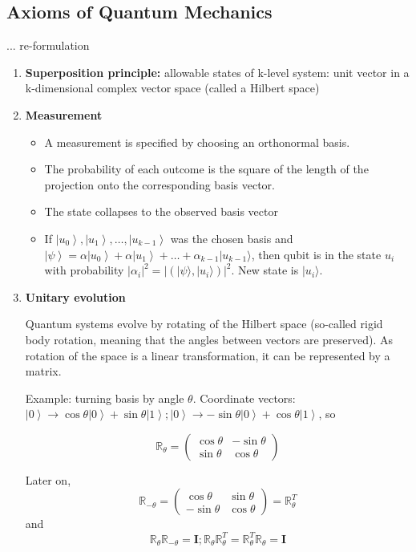 \documentclass{scrartcl}
\newcommand{\bigR}{\mathbb{R}} %
\newcommand{\ket}[1]{\left| #1 \right>} %
\begin{document}
\subsection{Axioms of Quantum Mechanics}
\label{sec:5-2}
... re-formulation
\begin{enumerate}
\item {\bf Superposition principle: } allowable states of k-level system: unit
  vector in a k-dimensional complex vector space (called a Hilbert space)

\item {\bf Measurement}

  \begin{itemize}
  \item A measurement is specified by choosing an orthonormal basis.
  \item The probability of each outcome is the square of the length of the
    projection onto the corresponding basis vector.
  \item The state collapses to the observed basis vector
  \item If $\ket{u_0}, \ket{u_1}, \dots, \ket{u_{k-1}}$ was the chosen basis and
    $\ket\psi = \alpha \ket{u_0} + \alpha \ket{u_1} + \dots + \alpha_{k-1} |
    u_{k-1}\rangle$, then qubit is in the state $u_i$ with probability
    $|\alpha_i|^2 = |(|\psi \rangle,|u_i\rangle)|^2$. New state is
    $|u_i\rangle$.
  \end{itemize}


\item {\bf Unitary evolution}

  Quantum systems evolve by rotating of the Hilbert space (so-called rigid body
  rotation, meaning that the angles between vectors are preserved). As rotation
  of the space is a linear transformation, it can be represented by a matrix.

  Example: turning basis by angle $\theta$. Coordinate vectors: $\ket0 \to \cos
  \theta \ket0 + \sin \theta \ket1;\ket0 \to - \sin \theta \ket0 + \cos \theta
  \ket1$, so

\[\bigR_\theta = \left( \begin{array}{cc}\cos\theta &-\sin\theta \\ \sin
    \theta & \cos\theta\end{array}  \right)\]

Later on, \[ \bigR_{- \theta} = \left( \begin{array}{cc} \cos \theta & \sin
    \theta \\ -\sin \theta & \cos \theta \end{array} \right) = \bigR_\theta^T \]
and \[ \bigR_\theta \bigR_{-\theta} = \mathbf{I}; \bigR_\theta \bigR_{\theta}^T
= \bigR_\theta^T \bigR_{\theta} = \mathbf{I} \]
\end{enumerate}
\end{document}
